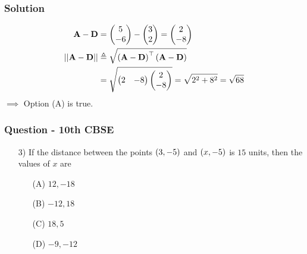 \documentclass{beamer}
\begin{document}
\begin{frame}
\frametitle{Solution}
\begin{align}
\textbf{A}-\textbf{D} &= \begin{pmatrix}
        5\\
        -6
    \end{pmatrix}-\begin{pmatrix}
        3\\
        2
    \end{pmatrix}=
    \begin{pmatrix}
        2\\
        -8
    \end{pmatrix}
\\    \lvert\lvert \textbf{A}-\textbf{D} \rvert\rvert &\triangleq \sqrt{\left(\textbf{A}-\textbf{D}\right)^\top\left(\textbf{A}-\textbf{D}\right)} \label{9}\\
    &= \sqrt{\begin{pmatrix}
        2 & -8 
    \end{pmatrix}
    \begin{pmatrix}
        2\\
        -8
    \end{pmatrix}}
    = \sqrt{2^2+8^2} =\sqrt{68} 
\end{align}
$\implies$ Option (A) is true.
\end{frame}




\begin{frame}
\frametitle{Question - 10th CBSE}
\begin{enumerate}
    \item [3)]
If the distance between the points $\left(3,-5\right)$ and $\left(x,-5\right)$ is $15$ units, then the values of $x$ are
\begin{enumerate}
\item [(A)] $12,-18$
\item [(B)] $-12,18$
\item [(C)] $18,5$
\item [(D)] $-9,-12$
\end{enumerate}
\end{enumerate}
\end{frame}
\end{document}
